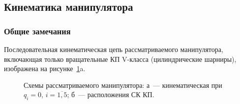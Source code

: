 \subsection{Кинематика манипулятора}\label{part_kinematics}

\subsubsection{Общие замечания}


Последовательная кинематическая цепь рассматриваемого манипулятора, включающая только вращательные КП V-класса (цилиндрические шарниры), изображена на рисунке~\ref{img:kinematics}a.

\begin{figure}[h!]
	\begin{minipage}[h]{0.5\linewidth}
	\end{minipage}
	\hfill
	\begin{minipage}[h]{0.5\linewidth}
	\end{minipage}
	\caption{Схемы рассматриваемого манипулятора: а~--- кинематическая при $q_i=0$, $i=\overline{1,5}$; б~--- расположения СК КП.}
	\label{img:kinematics}
\end{figure}

